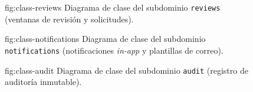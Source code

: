 \begin{figure}[Diagrama de clase del subdominio \texttt{reviews}]%
              {fig:class-reviews}%
              {Diagrama de clase del subdominio \texttt{reviews}
               (ventanas de revisión y solicitudes).}
\end{figure}

\begin{figure}[Diagrama de clase del subdominio \texttt{notifications}]%
              {fig:class-notifications}%
              {Diagrama de clase del subdominio \texttt{notifications}
               (notificaciones \textit{in-app} y plantillas de correo).}
\end{figure}

\begin{figure}[Diagrama de clase del subdominio \texttt{audit}]%
              {fig:class-audit}%
              {Diagrama de clase del subdominio \texttt{audit}
               (registro de auditoría inmutable).}
\end{figure}

